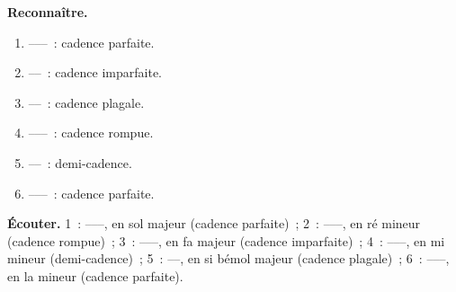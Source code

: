 \textbf{Reconnaître.}
\begin{enumerate}[leftmargin=*, itemsep=1pt]
  \item {}------~: cadence parfaite.
  \item {}----~: cadence imparfaite.
  \item {}----~: cadence plagale.
  \item {}------~: cadence rompue.
  \item {}----~: demi-cadence.
  \item {}------~: cadence parfaite.
\end{enumerate}
\textbf{Écouter.} 1~: ------, en sol majeur (cadence parfaite)~; 2~: ------, en ré mineur (cadence rompue)~; 3~: ------, en fa majeur (cadence imparfaite)~; 4~: ------, en mi mineur (demi-cadence)~; 5~: ----, en si bémol majeur (cadence plagale)~; 6~: ------, en la mineur (cadence parfaite).
